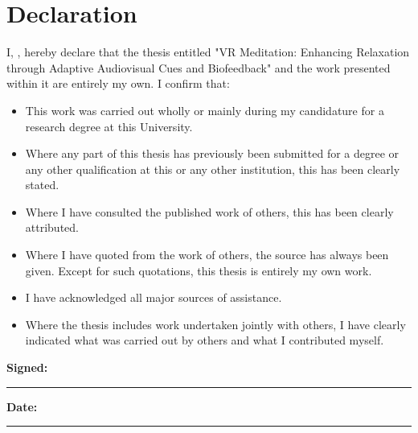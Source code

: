 \documentclass[headsepline,footsepline,12pt,textcomp=full]{scrreprt}
\begin{document}

\tableofcontents
\listoffigures
\listoftables

\newpage










\appendix

\newpage
% 
% 




\newenvironment{declaration}
  {\cleardoublepage\chapter*{Declaration}%
   }
  {}
\begin{declaration}
\noindent I, \saauthor, hereby declare that the thesis entitled "VR Meditation:
Enhancing Relaxation through Adaptive
Audiovisual Cues and Biofeedback" and the work presented within it are entirely my own. 
I confirm that:

\begin{itemize}
    \item This work was carried out wholly or mainly during my candidature for a research degree at this University.
    
    \item Where any part of this thesis has previously been submitted for a degree or any other qualification at this or any other institution, this has been clearly stated.
    
    \item Where I have consulted the published work of others, this has been clearly attributed.
    
    \item Where I have quoted from the work of others, the source has always been given. Except for such quotations, this thesis is entirely my own work.
    
    \item I have acknowledged all major sources of assistance.
    
    \item Where the thesis includes work undertaken jointly with others, I have clearly indicated what was carried out by others and what I contributed myself.
\end{itemize}

\vspace{2em}

\noindent\textbf{Signed:}\\[1em]
\rule{25em}{0.5pt}

\vspace{2em}

\noindent\textbf{Date:}\\[1em]
\rule{25em}{0.5pt}

\end{declaration}
\end{document}
